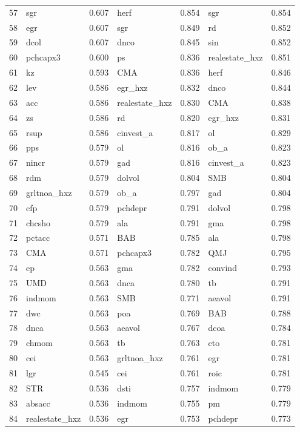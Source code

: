 \begin{footnotesize}
\begin{longtable}{r|lc|lc|lc}
  57 & sgr & 0.607 & herf & 0.854 & sgr & 0.854 \\ 
  58 & egr & 0.607 & sgr & 0.849 & rd & 0.852 \\ 
  59 & dcol & 0.607 & dnco & 0.845 & sin & 0.852 \\ 
  60 & pchcapx3 & 0.600 & ps & 0.836 & realestate\_hxz & 0.851 \\ 
  61 & kz & 0.593 & CMA & 0.836 & herf & 0.846 \\ 
  62 & lev & 0.586 & egr\_hxz & 0.832 & dnco & 0.844 \\ 
  63 & acc & 0.586 & realestate\_hxz & 0.830 & CMA & 0.838 \\ 
  64 & zs & 0.586 & rd & 0.820 & egr\_hxz & 0.831 \\ 
  65 & rsup & 0.586 & cinvest\_a & 0.817 & ol & 0.829 \\ 
  66 & pps & 0.579 & ol & 0.816 & ob\_a & 0.823 \\ 
  67 & nincr & 0.579 & gad & 0.816 & cinvest\_a & 0.823 \\ 
  68 & rdm & 0.579 & dolvol & 0.804 & SMB & 0.804 \\ 
  69 & grltnoa\_hxz & 0.579 & ob\_a & 0.797 & gad & 0.804 \\ 
  70 & cfp & 0.579 & pchdepr & 0.791 & dolvol & 0.798 \\ 
  71 & chcsho & 0.579 & ala & 0.791 & gma & 0.798 \\ 
  72 & pctacc & 0.571 & BAB & 0.785 & ala & 0.798 \\ 
  73 & CMA & 0.571 & pchcapx3 & 0.782 & QMJ & 0.795 \\ 
  74 & ep & 0.563 & gma & 0.782 & convind & 0.793 \\ 
  75 & UMD & 0.563 & dnca & 0.780 & tb & 0.791 \\ 
  76 & indmom & 0.563 & SMB & 0.771 & aeavol & 0.791 \\ 
  77 & dwc & 0.563 & poa & 0.769 & BAB & 0.788 \\ 
  78 & dnca & 0.563 & aeavol & 0.767 & dcoa & 0.784 \\ 
  79 & chmom & 0.563 & tb & 0.763 & cto & 0.781 \\ 
  80 & cei & 0.563 & grltnoa\_hxz & 0.761 & egr & 0.781 \\ 
  81 & lgr & 0.545 & cei & 0.761 & roic & 0.781 \\ 
  82 & STR & 0.536 & dsti & 0.757 & indmom & 0.779 \\ 
  83 & absacc & 0.536 & indmom & 0.755 & pm & 0.779 \\ 
  84 & realestate\_hxz & 0.536 & egr & 0.753 & pchdepr & 0.773 \\ 

\end{longtable}
\end{footnotesize}

